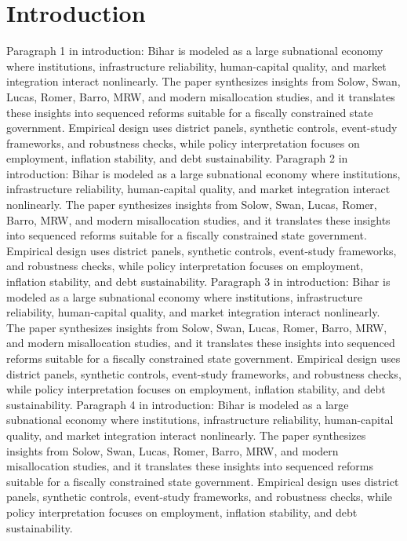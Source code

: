 \documentclass[preprint,12pt]{elsarticle}
\begin{document}
\section{Introduction}
Paragraph 1 in introduction: Bihar is modeled as a large subnational economy where institutions, infrastructure reliability, human-capital quality, and market integration interact nonlinearly. The paper synthesizes insights from Solow, Swan, Lucas, Romer, Barro, MRW, and modern misallocation studies, and it translates these insights into sequenced reforms suitable for a fiscally constrained state government. Empirical design uses district panels, synthetic controls, event-study frameworks, and robustness checks, while policy interpretation focuses on employment, inflation stability, and debt sustainability.
Paragraph 2 in introduction: Bihar is modeled as a large subnational economy where institutions, infrastructure reliability, human-capital quality, and market integration interact nonlinearly. The paper synthesizes insights from Solow, Swan, Lucas, Romer, Barro, MRW, and modern misallocation studies, and it translates these insights into sequenced reforms suitable for a fiscally constrained state government. Empirical design uses district panels, synthetic controls, event-study frameworks, and robustness checks, while policy interpretation focuses on employment, inflation stability, and debt sustainability.
Paragraph 3 in introduction: Bihar is modeled as a large subnational economy where institutions, infrastructure reliability, human-capital quality, and market integration interact nonlinearly. The paper synthesizes insights from Solow, Swan, Lucas, Romer, Barro, MRW, and modern misallocation studies, and it translates these insights into sequenced reforms suitable for a fiscally constrained state government. Empirical design uses district panels, synthetic controls, event-study frameworks, and robustness checks, while policy interpretation focuses on employment, inflation stability, and debt sustainability.
Paragraph 4 in introduction: Bihar is modeled as a large subnational economy where institutions, infrastructure reliability, human-capital quality, and market integration interact nonlinearly. The paper synthesizes insights from Solow, Swan, Lucas, Romer, Barro, MRW, and modern misallocation studies, and it translates these insights into sequenced reforms suitable for a fiscally constrained state government. Empirical design uses district panels, synthetic controls, event-study frameworks, and robustness checks, while policy interpretation focuses on employment, inflation stability, and debt sustainability.
\end{document}
